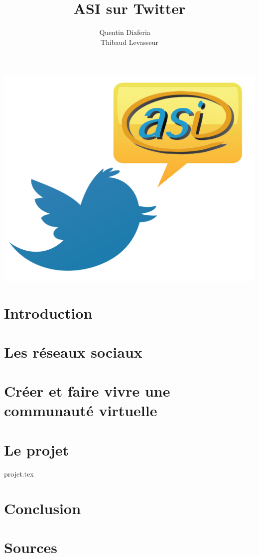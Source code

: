 \documentclass[a4paper,12pt]{article}
\title{ASI sur Twitter}
\author{Quentin Diaferia ~~\\ Thibaud Levasseur}
\begin{document}
\maketitle
\begin{center}
\includegraphics{image/ASITwitter.png}
\end{center}
\newpage
\tableofcontents
\newpage
\section{Introduction}

\newpage
\section{Les réseaux sociaux}

\newpage
\section{Créer et faire vivre une communauté virtuelle}

\newpage
\section{Le projet}
 {projet.tex}
\newpage
\section{Conclusion}

\newpage
\section{Sources}

\end{document}
